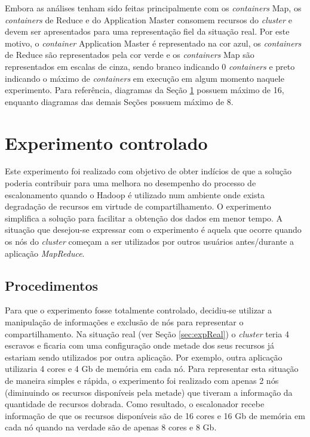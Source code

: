 Embora as análises tenham sido feitas principalmente com os \textit{containers} Map, os \textit{containers} de Reduce e do Application Master consomem recursos do \textit{cluster} e devem ser apresentados para uma representação fiel da situação real. Por este motivo, o \textit{container} Application Master é representado na cor azul, os \textit{containers} de Reduce são representados pela cor verde e os \textit{containers} Map são representados em escalas de cinza, sendo branco indicando 0 \textit{containers} e preto indicando o máximo de \textit{containers} em execução em algum momento naquele experimento. Para referência, diagramas da Seção \ref{sec:expCont} possuem máximo de 16, enquanto diagramas das demais Seções possuem máximo de 8.

\section{Experimento controlado}
\label{sec:expCont}
Este experimento foi realizado com objetivo de obter indícios de que a solução poderia contribuir para uma melhora no desempenho do processo de escalonamento quando o Hadoop é utilizado num ambiente onde exista degradação de recursos em virtude de compartilhamento. O experimento simplifica a solução para facilitar a obtenção dos dados em menor tempo. A situação que desejou-se expressar com o experimento é aquela que ocorre quando os nós do \textit{cluster} começam a ser utilizados por outros usuários antes/durante a aplicação \textit{MapReduce}.

\subsection{Procedimentos}
Para que o experimento fosse totalmente controlado, decidiu-se utilizar a manipulação de informações e exclusão de nós para representar o compartilhamento. Na situação real (ver Seção \ref{sec:expReal}) o \textit{cluster} teria 4 escravos e ficaria com uma configuração onde metade dos seus recursos já estariam sendo utilizados por outra aplicação. Por exemplo, outra aplicação utilizaria 4 cores e 4 Gb de memória em cada nó. Para representar esta situação de maneira simples e rápida, o experimento foi realizado com apenas 2 nós (diminuindo os recursos disponíveis pela metade) que tiveram a informação da quantidade de recursos dobrada. Como resultado, o escalonador recebe informação de que os recursos disponíveis são de 16 cores e 16 Gb de memória em cada nó quando na verdade são de apenas 8 cores e 8 Gb. 

